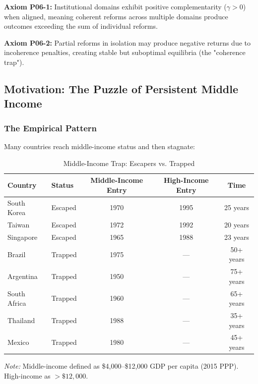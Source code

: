 \begin{tcolorbox}[colback=yellow!5!white, colframe=yellow!75!black,
    title=Axiom P06-1: Coherence Complementarity]
\textbf{Axiom P06-1:}
Institutional domains exhibit positive complementarity ($\gamma > 0$) when aligned,
meaning coherent reforms across multiple domains produce outcomes exceeding the
sum of individual reforms.
\end{tcolorbox}

\begin{tcolorbox}[colback=yellow!5!white, colframe=yellow!75!black,
    title=Axiom P06-2: Partial Reform Trap]
\textbf{Axiom P06-2:}
Partial reforms in isolation may produce negative returns due to incoherence
penalties, creating stable but suboptimal equilibria (the "coherence trap").
\end{tcolorbox}



\subsection{Motivation: The Puzzle of Persistent Middle Income}

\subsubsection{The Empirical Pattern}

Many countries reach middle-income status and then stagnate:

\begin{table}[htbp]
\centering
\caption{Middle-Income Trap: Escapers vs. Trapped}
\label{tab:mit-examples}
\small
\begin{tabular}{@{}llccc@{}}
\toprule
\textbf{Country} & \textbf{Status} & \textbf{Middle-Income Entry} & \textbf{High-Income Entry} & \textbf{Time} \\
\midrule
South Korea & Escaped & 1970 & 1995 & 25 years \\
Taiwan & Escaped & 1972 & 1992 & 20 years \\
Singapore & Escaped & 1965 & 1988 & 23 years \\
\midrule
Brazil & Trapped & 1975 & --- & 50+ years \\
Argentina & Trapped & 1950 & --- & 75+ years \\
South Africa & Trapped & 1960 & --- & 65+ years \\
Thailand & Trapped & 1988 & --- & 35+ years \\
Mexico & Trapped & 1980 & --- & 45+ years \\
\bottomrule
\end{tabular}
\begin{flushleft}
\small\textit{Note:} Middle-income defined as \$4,000--\$12,000 GDP per capita (2015 PPP). High-income as $>\$12,000$.
\end{flushleft}
\end{table}

